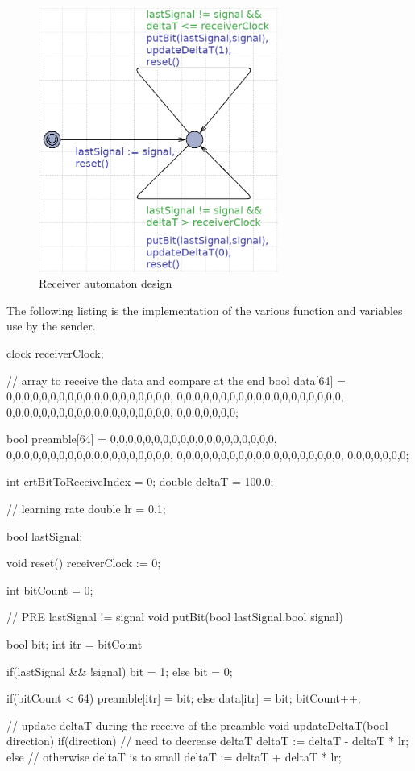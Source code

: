 \documentclass[a4paper,11pt]{report}
\begin{document}
\begin{figure}[ht]
  \centering
  \includegraphics[width=0.7\textwidth]{figures/receiver}
  \caption{\label{fig:receiver} Receiver automaton design}
\end{figure}

The following listing is the implementation of the various function and
variables use by the sender.

\newpage

\begin{promelacode}
clock receiverClock;

// array to receive the data and compare at the end
bool data[64] = {
    0,0,0,0,0,0,0,0,0,0,0,0,0,0,0,0,0,0,0,
    0,0,0,0,0,0,0,0,0,0,0,0,0,0,0,0,0,0,0,
    0,0,0,0,0,0,0,0,0,0,0,0,0,0,0,0,0,0,0,
    0,0,0,0,0,0,0};

bool preamble[64] = {
    0,0,0,0,0,0,0,0,0,0,0,0,0,0,0,0,0,0,0,
    0,0,0,0,0,0,0,0,0,0,0,0,0,0,0,0,0,0,0,
    0,0,0,0,0,0,0,0,0,0,0,0,0,0,0,0,0,0,0,
    0,0,0,0,0,0,0};

int crtBitToReceiveIndex = 0;
double deltaT = 100.0;

// learning rate
double lr = 0.1;

bool lastSignal;

void reset()
{
    receiverClock := 0;
}

int bitCount = 0;

// PRE lastSignal != signal
void putBit(bool lastSignal,bool signal) {
    bool bit;
    int itr = bitCount %

    if(lastSignal && !signal) {
        bit = 1;
    } else {
        bit = 0;
    }

    if(bitCount < 64) {
        preamble[itr] = bit;
    }
    else {
        data[itr] = bit;
    }
    bitCount++;
}

// update deltaT during the receive of the preamble
void updateDeltaT(bool direction) {
    if(direction) { // need to decrease deltaT
        deltaT := deltaT - deltaT * lr;
    }
    else { // otherwise deltaT is to small
        deltaT := deltaT + deltaT * lr;
    }
}
\end{promelacode}
\end{document}
